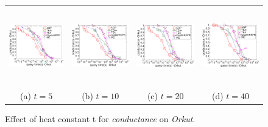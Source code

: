 \begin{figure}[t]
	\begin{small}
		\centering
		\vspace{-1mm}
		\begin{tabular}{cccc}
			\hspace{-4mm} \includegraphics[height=34mm]{./Figs/HKPR-conductance-query-OL.eps} &
			\hspace{-4mm} \includegraphics[height=34mm]{./Figs/HKPR-10-conductance-query-OL.eps} &
			\hspace{-4mm} \includegraphics[height=34mm]{./Figs/HKPR-20-conductance-query-OL.eps} &
			\hspace{-4mm} \includegraphics[height=34mm]{./Figs/HKPR-40-conductance-query-OL.eps} \\
			(a) $t=5$ & (b) $t=10$ & (c) $t=20$ & (d) $t=40$ 
		\end{tabular}
		\vspace{-5mm}
		\caption{Effect of heat constant t for {\em conductance} on {\em Orkut}.}
		\label{fig:conductance-query-OL}
	\end{small}
\end{figure}

